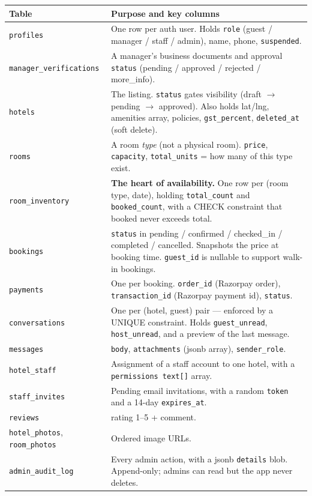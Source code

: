 \documentclass[11pt,a4paper]{article}
\begin{document}
\begin{longtable}{@{}p{3.5cm}p{11.3cm}@{}}
\toprule
\textbf{Table} & \textbf{Purpose and key columns} \\
\midrule
\endhead
\texttt{profiles} & One row per auth user. Holds \texttt{role}
(guest / manager / staff / admin), name, phone, \texttt{suspended}. \\
\addlinespace
\texttt{manager\_verifications} & A manager's business documents and approval
\texttt{status} (pending / approved / rejected / more\_info). \\
\addlinespace
\texttt{hotels} & The listing. \texttt{status} gates visibility
(draft $\to$ pending $\to$ approved). Also holds lat/lng, amenities array,
policies, \texttt{gst\_percent}, \texttt{deleted\_at} (soft delete). \\
\addlinespace
\texttt{rooms} & A room \emph{type} (not a physical room). \texttt{price},
\texttt{capacity}, \texttt{total\_units} = how many of this type exist. \\
\addlinespace
\texttt{room\_inventory} & \textbf{The heart of availability.} One row per
(room type, date), holding \texttt{total\_count} and \texttt{booked\_count},
with a CHECK constraint that booked never exceeds total. \\
\addlinespace
\texttt{bookings} & \texttt{status} in pending / confirmed / checked\_in /
completed / cancelled. Snapshots the price at booking time. \texttt{guest\_id}
is nullable to support walk-in bookings. \\
\addlinespace
\texttt{payments} & One per booking. \texttt{order\_id} (Razorpay order),
\texttt{transaction\_id} (Razorpay payment id), \texttt{status}. \\
\addlinespace
\texttt{conversations} & One per (hotel, guest) pair --- enforced by a UNIQUE
constraint. Holds \texttt{guest\_unread}, \texttt{host\_unread}, and a preview
of the last message. \\
\addlinespace
\texttt{messages} & \texttt{body}, \texttt{attachments} (jsonb array),
\texttt{sender\_role}. \\
\addlinespace
\texttt{hotel\_staff} & Assignment of a staff account to one hotel, with a
\texttt{permissions text[]} array. \\
\addlinespace
\texttt{staff\_invites} & Pending email invitations, with a random
\texttt{token} and a 14-day \texttt{expires\_at}. \\
\addlinespace
\texttt{reviews} & rating 1--5 + comment. \\
\addlinespace
\texttt{hotel\_photos}, \texttt{room\_photos} & Ordered image URLs. \\
\addlinespace
\texttt{admin\_audit\_log} & Every admin action, with a jsonb \texttt{details}
blob. Append-only; admins can read but the app never deletes. \\
\bottomrule
\end{longtable}
\end{document}
